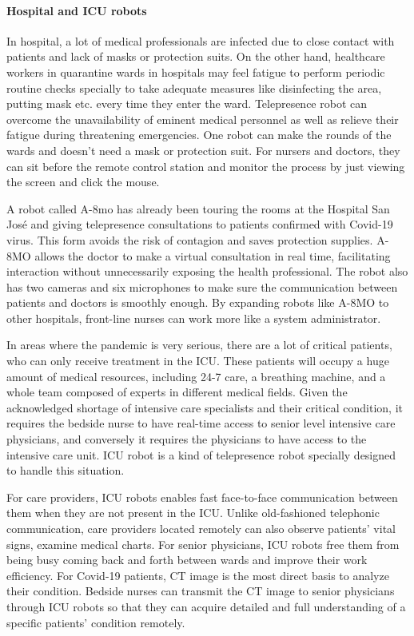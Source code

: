 \documentclass[a4paper]{article}
\begin{document}
\paragraph{Hospital and ICU robots}
    In hospital, a lot of medical professionals are infected due to close contact with patients and lack of masks or protection suits.  On the other hand, healthcare workers in quarantine wards in hospitals may feel fatigue to perform periodic routine checks specially to take adequate measures like disinfecting the area, putting mask etc. every time they enter the ward. Telepresence robot can overcome the unavailability of eminent medical personnel as well as relieve their fatigue during threatening emergencies\cite{7}. One robot can make the rounds of the wards and doesn't need a mask or protection suit. For nursers and doctors, they can sit before the remote control station and monitor the process by just viewing the screen and click the mouse.
\par 
    A robot called A-8mo has already been touring the rooms at the Hospital San José and giving telepresence consultations to patients confirmed with Covid-19 virus. This form avoids the risk of contagion and saves protection supplies\cite{8}. A-8MO allows the doctor to make a virtual consultation in real time, facilitating interaction without unnecessarily exposing the health professional. The robot also has two cameras and six microphones to make sure the communication between patients and doctors is smoothly enough. By expanding robots like A-8MO to other hospitals, front-line nurses can work more like a system administrator\cite{9}.
\par 
    In areas where the pandemic is very serious, there are a lot of critical patients, who can only receive treatment in the ICU. These patients will occupy a huge amount of medical resources, including 24-7 care, a breathing machine, and a whole team composed of experts in different medical fields. Given the acknowledged shortage of intensive care specialists and their critical condition, it requires the bedside nurse to have real-time access to senior level intensive care physicians, and conversely it requires the physicians to have access to the intensive care unit\cite{10}. ICU robot is a kind of telepresence robot specially designed to handle this situation. 
\par 
    For care providers, ICU robots enables fast face-to-face communication between them when they are not present in the ICU. Unlike old-fashioned telephonic communication, care providers located remotely can also observe patients' vital signs, examine medical charts\cite{11}. For senior physicians, ICU robots free them from being busy coming back and forth between wards and improve their work efficiency. For Covid-19 patients, CT image is the most direct basis to analyze their condition. Bedside nurses can transmit the CT image to senior physicians through ICU robots so that they can acquire detailed and full understanding of a specific patients' condition remotely. 
\end{document}
